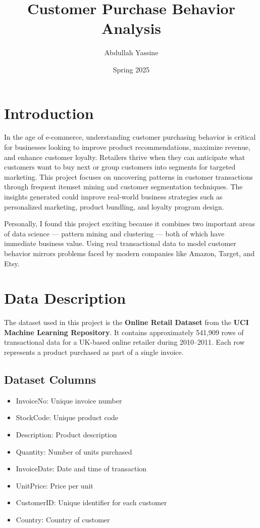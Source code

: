 \documentclass[12pt]{article}
\title{Customer Purchase Behavior Analysis}
\author{Abdullah Yassine}
\date{Spring 2025}
\begin{document}
\maketitle

\section{Introduction}

In the age of e-commerce, understanding customer purchasing behavior is critical for businesses looking to improve product recommendations, maximize revenue, and enhance customer loyalty. Retailers thrive when they can anticipate what customers want to buy next or group customers into segments for targeted marketing. This project focuses on uncovering patterns in customer transactions through frequent itemset mining and customer segmentation techniques. The insights generated could improve real-world business strategies such as personalized marketing, product bundling, and loyalty program design.

Personally, I found this project exciting because it combines two important areas of data science — pattern mining and clustering — both of which have immediate business value. Using real transactional data to model customer behavior mirrors problems faced by modern companies like Amazon, Target, and Etsy.

\section{Data Description}

The dataset used in this project is the \textbf{Online Retail Dataset} from the \textbf{UCI Machine Learning Repository}.  
It contains approximately 541,909 rows of transactional data for a UK-based online retailer during 2010–2011.  
Each row represents a product purchased as part of a single invoice.

\subsection*{Dataset Columns}
\begin{itemize}
    \item InvoiceNo: Unique invoice number
    \item StockCode: Unique product code
    \item Description: Product description
    \item Quantity: Number of units purchased
    \item InvoiceDate: Date and time of transaction
    \item UnitPrice: Price per unit
    \item CustomerID: Unique identifier for each customer
    \item Country: Country of customer
\end{itemize}
\end{document}
